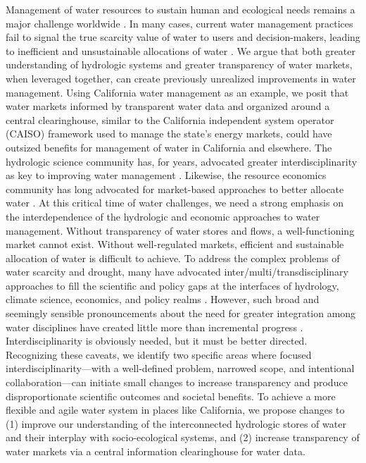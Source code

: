 Management of water resources to sustain human and ecological needs remains a major challenge worldwide \citep{mcdonnell_debatesfuture_2014,wheater_water_2015,vorosmarty_global_2000,vorosmarty_global_2010,wada_global_2010,elliott_constraints_2014}. In many cases, current water management practices fail to signal the true scarcity value of water to users and decision-makers, leading to inefficient and unsustainable allocations of water \citep{harou_hydro-economic_2009}. We argue that both greater understanding of hydrologic systems and greater transparency of water markets, when leveraged together, can create previously unrealized improvements in water management. Using California water management as an example, we posit that water markets informed by transparent water data and organized around a central clearinghouse, similar to the California independent system operator (CAISO) framework used to manage the state’s energy markets, could have outsized benefits for management of water in California and elsewhere.
The hydrologic science community has, for years, advocated greater interdisciplinarity as key to improving water management \citep{national_research_council_opportunities_1991}. Likewise, the resource economics community has long advocated for market-based approaches to better allocate water \citep{howe_innovative_1986,sunding_measuring_2002,vaux_managing_1984}. At this critical time of water challenges, we need a strong emphasis on the interdependence of the hydrologic and economic approaches to water management. Without transparency of water stores and flows, a well-functioning market cannot exist. Without well-regulated markets, efficient and sustainable allocation of water is difficult to achieve.
To address the complex problems of water scarcity and drought, many have advocated inter/multi/transdisciplinary approaches to fill the scientific and policy gaps at the interfaces of hydrology, climate science, economics, and policy realms \citep{national_research_council_opportunities_1991,postel_entering_2000,krueger_transdisciplinary_2016,wesselink_socio-hydrology_2017,montanari_fifty_2015,vogel_hydrology:_2015,wagener_future_2010,freeze_blueprint_1969}. However, such broad and seemingly sensible pronouncements about the need for greater integration among water disciplines have created little more than incremental progress \citep{mcdonnell_debatesfuture_2014,wheater_water_2015,lubell_collaborative_2004}. Interdisciplinarity is obviously needed, but it must be better directed. Recognizing these caveats, we identify two specific areas where focused interdisciplinarity—with a well-defined problem, narrowed scope, and intentional collaboration—can initiate small changes to increase transparency and produce disproportionate scientific outcomes and societal benefits. To achieve a more flexible and agile water system in places like California, we propose changes to (1) improve our understanding of the interconnected hydrologic stores of water and their interplay with socio-ecological systems, and (2) increase transparency of water markets via a central information clearinghouse for water data.

